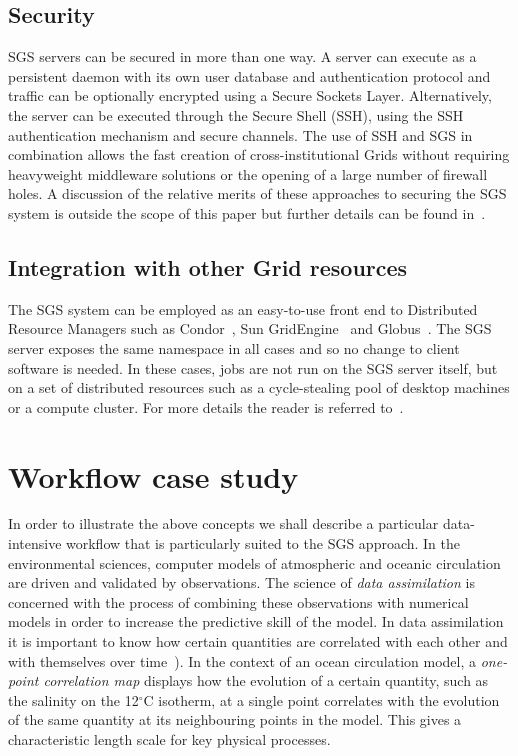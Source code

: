 \documentclass[a4paper]{article}
\begin{document}
\subsection{Security}
SGS servers can be secured in more than one way.  A server can execute as a persistent daemon with its own user database and authentication protocol and traffic can be optionally encrypted using a Secure Sockets Layer.  Alternatively, the server can be executed through the Secure Shell (SSH), using the SSH authentication mechanism and secure channels.  The use of SSH and SGS in combination allows the fast creation of cross-institutional Grids without requiring heavyweight middleware solutions or the opening of a large number of firewall holes.  A discussion of the relative merits of these approaches to securing the SGS system is outside the scope of this paper but further details can be found in~\cite{blower_escience:2006}. 

\subsection{Integration with other Grid resources}
The SGS system can be employed as an easy-to-use front end to Distributed Resource Managers such as Condor~\cite{condor}, Sun GridEngine~\cite{sungridengine} and Globus~\cite{globustoolkit}.  The SGS server exposes the same namespace in all cases and so no change to client software is needed.  In these cases, jobs are not run on the SGS server itself, but on a set of distributed resources such as a cycle-stealing pool of desktop machines or a compute cluster.  For more details the reader is referred to~\cite{blower_escience:2006}.

\section{Workflow case study}\label{sec:casestudy}
In order to illustrate the above concepts we shall describe a particular data-intensive workflow that is particularly suited to the SGS approach.  In the environmental sciences, computer models of atmospheric and oceanic circulation are driven and validated by observations.  The science of \textit{data assimilation} is concerned with the process of combining these observations with numerical models in order to increase the predictive skill of the model.  In data assimilation it is important to know how certain quantities are correlated with each other and with themselves over time~\cite{haines:2006}).  In the context of an ocean circulation model, a \textit{one-point correlation map} displays how the evolution of a certain quantity, such as the salinity on the 12$^\circ$C isotherm, at a single point correlates with the evolution of the same quantity at its neighbouring points in the model.  This gives a characteristic length scale for key physical processes.
\end{document}
